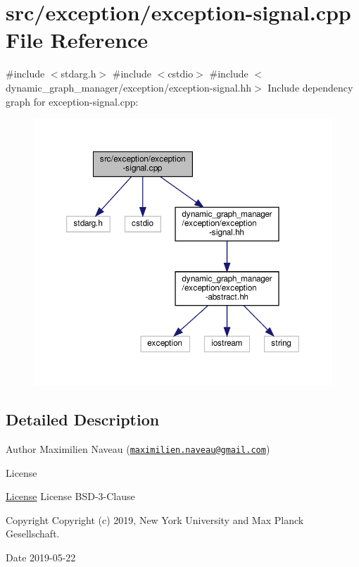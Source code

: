 \hypertarget{exception-signal_8cpp}{}\section{src/exception/exception-\/signal.cpp File Reference}
\label{exception-signal_8cpp}
{\ttfamily \#include $<$stdarg.\+h$>$}\newline
{\ttfamily \#include $<$cstdio$>$}\newline
{\ttfamily \#include $<$dynamic\+\_\+graph\+\_\+manager/exception/exception-\/signal.\+hh$>$}\newline
Include dependency graph for exception-\/signal.cpp\+:
\nopagebreak
\begin{figure}[H]
\begin{center}
\leavevmode
\includegraphics[width=350pt]{exception-signal_8cpp__incl}
\end{center}
\end{figure}


\subsection{Detailed Description}
\begin{DoxyAuthor}{Author}
Maximilien Naveau (\href{mailto:maximilien.naveau@gmail.com}{\tt maximilien.\+naveau@gmail.\+com}) 
\end{DoxyAuthor}
\begin{DoxyRefDesc}{License}
\item[\hyperlink{license__license000048}{License}]License B\+S\+D-\/3-\/\+Clause \end{DoxyRefDesc}
\begin{DoxyCopyright}{Copyright}
Copyright (c) 2019, New York University and Max Planck Gesellschaft. 
\end{DoxyCopyright}
\begin{DoxyDate}{Date}
2019-\/05-\/22 
\end{DoxyDate}
